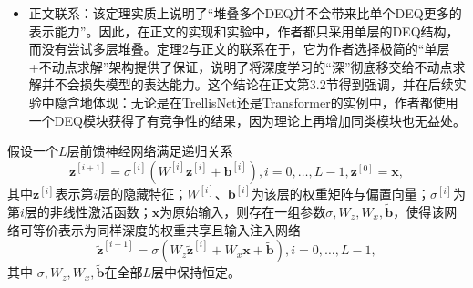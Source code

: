 \documentclass[cn,hazy,cyan,11pt,normal]{elegantnote}
\begin{document}
\begin{itemize}
        \item 正文联系：该定理实质上说明了“堆叠多个DEQ并不会带来比单个DEQ更多的表示能力”。因此，在正文的实现和实验中，作者都只采用单层的DEQ结构，而没有尝试多层堆叠。定理2与正文的联系在于，它为作者选择极简的“单层+不动点求解”架构提供了保证，说明了将深度学习的“深”彻底移交给不动点求解并不会损失模型的表达能力。这个结论在正文第3.2节得到强调，并在后续实验中隐含地体现：无论是在TrellisNet还是Transformer的实例中，作者都使用一个DEQ模块获得了有竞争性的结果，因为理论上再增加同类模块也无益处。
    \end{itemize}

    \begin{theorem}[权重共享深层网络的通用性]
        假设一个$L$层前馈神经网络满足递归关系\[\mathbf{z}^{[i+1]}=\sigma^{[i]}(W^{[i]}\mathbf{z}^{[i]}+\mathbf{b}^{[i]}),i=0,\ldots,L-1,\mathbf{z}^{[0]}=\mathbf{x},\]其中$\mathbf{z}^{[i]}$表示第$i$层的隐藏特征；$W^{[i]}$、$\mathbf{b}^{[i]}$为该层的权重矩阵与偏置向量；$\sigma^{[i]}$为第$i$层的非线性激活函数；$\mathbf{x}$为原始输入，则存在一组参数$\sigma,W_z,W_x,\tilde{\mathbf{b}}$，使得该网络可等价表示为同样深度的权重共享且输入注入网络\[\tilde{\mathbf{z}}^{[i+1]}=\sigma(W_z\tilde{\mathbf{z}}^{[i]}+W_x\mathbf{x}+\tilde{\mathbf{b}}),i=0,\ldots,L-1,\]其中 $\sigma,W_z,W_x,\tilde{\mathbf{b}}$在全部$L$层中保持恒定。
    \end{theorem}
\end{document}
